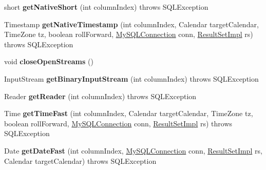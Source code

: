 \begin{DoxyCompactItemize}
short {\bfseries get\+Native\+Short} (int column\+Index)  throws S\+Q\+L\+Exception 
\item 
\mbox{\label{classcom_1_1mysql_1_1jdbc_1_1_byte_array_row_a5aec9358cda60b286dbf2429061e0e32}} 
Timestamp {\bfseries get\+Native\+Timestamp} (int column\+Index, Calendar target\+Calendar, Time\+Zone tz, boolean roll\+Forward, \mbox{\hyperlink{interfacecom_1_1mysql_1_1jdbc_1_1_my_s_q_l_connection}{My\+S\+Q\+L\+Connection}} conn, \mbox{\hyperlink{classcom_1_1mysql_1_1jdbc_1_1_result_set_impl}{Result\+Set\+Impl}} rs)  throws S\+Q\+L\+Exception 
\item 
\mbox{\label{classcom_1_1mysql_1_1jdbc_1_1_byte_array_row_a7777b2865899d9856d2ef9229919c101}} 
void {\bfseries close\+Open\+Streams} ()
\item 
\mbox{\label{classcom_1_1mysql_1_1jdbc_1_1_byte_array_row_a9a750fd4f1bb941651413bca8a94d2ae}} 
Input\+Stream {\bfseries get\+Binary\+Input\+Stream} (int column\+Index)  throws S\+Q\+L\+Exception 
\item 
\mbox{\label{classcom_1_1mysql_1_1jdbc_1_1_byte_array_row_ad05ec72e358532270d3e8e2ccf899372}} 
Reader {\bfseries get\+Reader} (int column\+Index)  throws S\+Q\+L\+Exception 
\item 
\mbox{\label{classcom_1_1mysql_1_1jdbc_1_1_byte_array_row_ab5c8fe510262991e4fe803d78d262bb1}} 
Time {\bfseries get\+Time\+Fast} (int column\+Index, Calendar target\+Calendar, Time\+Zone tz, boolean roll\+Forward, \mbox{\hyperlink{interfacecom_1_1mysql_1_1jdbc_1_1_my_s_q_l_connection}{My\+S\+Q\+L\+Connection}} conn, \mbox{\hyperlink{classcom_1_1mysql_1_1jdbc_1_1_result_set_impl}{Result\+Set\+Impl}} rs)  throws S\+Q\+L\+Exception 
\item 
\mbox{\label{classcom_1_1mysql_1_1jdbc_1_1_byte_array_row_a3412ef36beeab5268f500ba213d15acc}} 
Date {\bfseries get\+Date\+Fast} (int column\+Index, \mbox{\hyperlink{interfacecom_1_1mysql_1_1jdbc_1_1_my_s_q_l_connection}{My\+S\+Q\+L\+Connection}} conn, \mbox{\hyperlink{classcom_1_1mysql_1_1jdbc_1_1_result_set_impl}{Result\+Set\+Impl}} rs, Calendar target\+Calendar)  throws S\+Q\+L\+Exception 

\end{DoxyCompactItemize}
